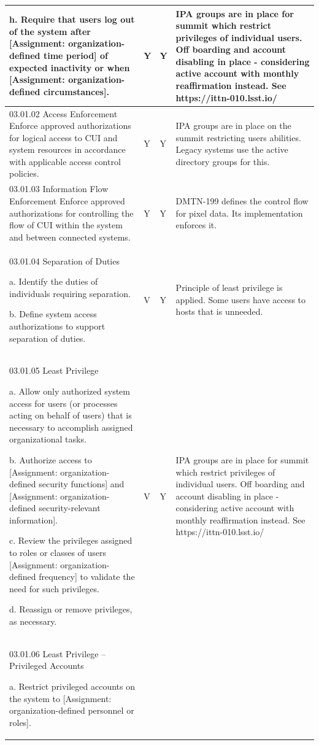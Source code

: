 \begin{longtable} {|p{}|p{}|p{}|p{} |}
{h. Require that users log out of the system after [Assignment: organization-defined time period] of expected inactivity or when [Assignment: organization-defined circumstances].}&{Y}&{Y}&{IPA groups are in place for summit  which restrict privileges of individual users.
Off boarding and account disabling  in place - considering active account with monthly reaffirmation instead.
See https://ittn-010.lsst.io/} \\ \hline
{03.01.02 Access Enforcement
Enforce approved authorizations for logical access to CUI and system resources in
accordance with applicable access control policies.}&{Y}&{Y}&{IPA groups are in place on the summit restricting users abilities. Legacy systems use the active directory groups for this.} \\ \hline
{03.01.03 Information Flow Enforcement
Enforce approved authorizations for controlling the flow of CUI within the system and between connected systems.}&{Y}&{Y}&{DMTN-199 defines the control flow for pixel data. Its implementation enforces it.} \\ \hline
{03.01.04 Separation of Duties

a. Identify the duties of individuals requiring separation.

b. Define system access authorizations to support separation of duties.}&{V}&{Y}&{Principle of least privilege is applied. Some users have access to hosts that is unneeded.} \\ \hline
{03.01.05 Least Privilege

a. Allow only authorized system access for users (or processes acting on behalf of users) that is necessary to accomplish assigned organizational tasks.

b. Authorize access to [Assignment: organization-defined security functions] and [Assignment: organization-defined security-relevant information].

c. Review the privileges assigned to roles or classes of users [Assignment: organization-defined frequency] to validate the need for such privileges.

d. Reassign or remove privileges, as necessary.}&{V}&{Y}&{IPA groups are in place for summit  which restrict privileges of individual users.
Off boarding and account disabling  in place - considering active account with monthly reaffirmation instead.
See https://ittn-010.lsst.io/} \\ \hline
{03.01.06 Least Privilege – Privileged Accounts

a. Restrict privileged accounts on the system to [Assignment: organization-defined personnel or roles].

}
\end{longtable}
